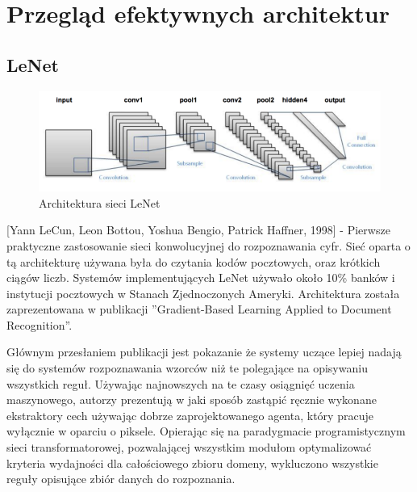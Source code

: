 \documentclass[12pt,a4paper,twoside,titlepage,openright]{book}
\begin{document}
\section{Przegląd efektywnych architektur}

\subsection{LeNet}
\begin{figure}[ht]
	\centering
			\includegraphics[resolution=100, scale=0.6]{LeNet.png}
		\caption{Architektura sieci LeNet}
\end{figure}

[Yann LeCun, Leon Bottou, Yoshua Bengio, Patrick Haffner, 1998] - Pierwsze praktyczne zastosowanie sieci konwolucyjnej do rozpoznawania cyfr. Sieć oparta o tą architekturę używana była do czytania kodów pocztowych, oraz krótkich ciągów liczb. Systemów implementujących LeNet używało około 10\% banków i instytucji pocztowych w Stanach Zjednoczonych Ameryki. Architektura została zaprezentowana w publikacji ''Gradient-Based Learning Applied to Document Recognition''.

Głównym przesłaniem publikacji jest pokazanie że systemy uczące lepiej nadają się do systemów rozpoznawania wzorców niż te polegające na opisywaniu wszystkich reguł. Używając najnowszych na te czasy osiągnięć uczenia maszynowego, autorzy prezentują w jaki sposób zastąpić ręcznie wykonane ekstraktory cech używając dobrze zaprojektowanego agenta, który pracuje wyłącznie w oparciu o piksele. Opierając się na paradygmacie programistycznym sieci transformatorowej, pozwalającej wszystkim modułom optymalizować kryteria wydajności dla całościowego zbioru domeny, wykluczono wszystkie reguły opisujące zbiór danych do rozpoznania.
\end{document}
